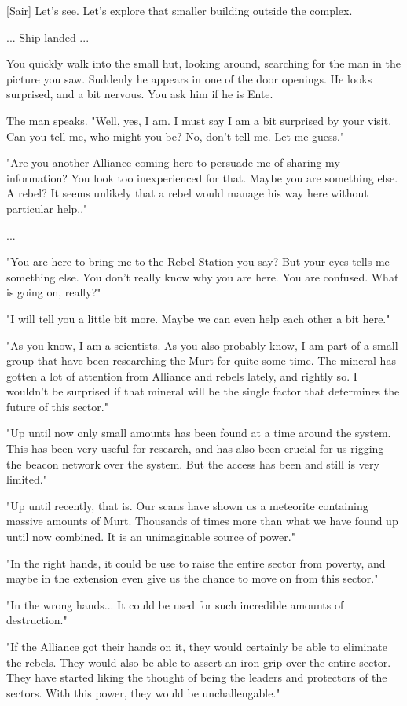 \documentclass[a4paper,12pt]{article}
\begin{document}
[Sair] Let's see. Let's explore that smaller building outside the complex.

... Ship landed ...

You quickly walk into the small hut, looking around, searching for the man in the picture you saw.
Suddenly he appears in one of the door openings. He looks surprised, and a bit nervous. You ask him if
he is Ente.

The man speaks. "Well, yes, I am. I must say I am a bit surprised by your visit. Can you tell me, who might you be? No,
don't tell me. Let me guess."

"Are you another Alliance coming here to persuade me of sharing my information? You look too inexperienced for that.
Maybe you are something else. A rebel? It seems unlikely that a rebel would manage his way here without particular help.."

...

"You are here to bring me to the Rebel Station you say? But your eyes tells me something else. You don't really know
why you are here. You are confused. What is going on, really?"

"I will tell you a little bit more. Maybe we can even help each other a bit here."

"As you know, I am a scientists. As you also probably know, I am part of a small group that have been researching the Murt
for quite some time. The mineral has gotten a lot of attention from Alliance and rebels lately, and rightly so. I wouldn't be
surprised if that mineral will be the single factor that determines the future of this sector."

"Up until now only small amounts has been found at a time around the system. This has been very useful for research, and
has also been crucial for us rigging the beacon network over the system. But the access has been and still is very limited."

"Up until recently, that is. Our scans have shown us a meteorite containing massive amounts of Murt. Thousands of times
more than what we have found up until now combined. It is an unimaginable source of power."

"In the right hands, it could be use to raise the entire sector from poverty, and maybe in the extension even give us the
chance to move on from this sector."

"In the wrong hands... It could be used for such incredible amounts of destruction."

"If the Alliance got their hands on it, they would certainly be able to eliminate the rebels. They would also be able to assert
an iron grip over the entire sector. They have started liking the thought of being the leaders and protectors of the sectors.
With this power, they would be unchallengable."
\end{document}
